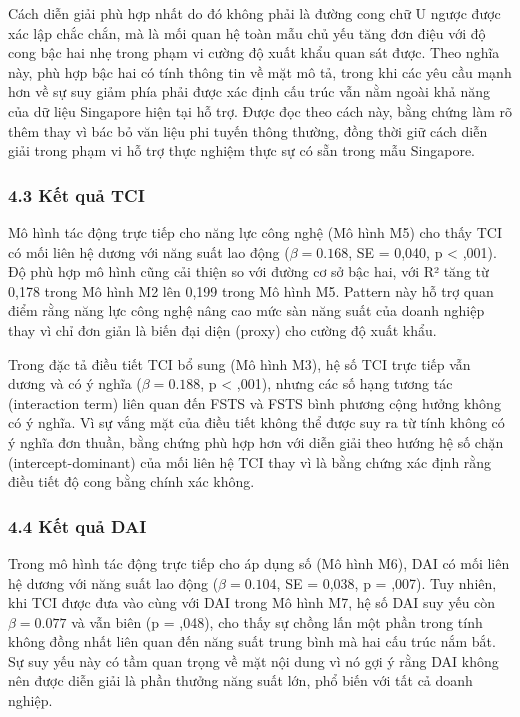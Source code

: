 \documentclass[12pt,a4paper]{article}
\begin{document}
Cách diễn giải phù hợp nhất do đó không phải là đường cong chữ U ngược
được xác lập chắc chắn, mà là mối quan hệ toàn mẫu chủ yếu tăng đơn điệu
với độ cong bậc hai nhẹ trong phạm vi cường độ xuất khẩu quan sát được.
Theo nghĩa này, phù hợp bậc hai có tính thông tin về mặt mô tả, trong
khi các yêu cầu mạnh hơn về sự suy giảm phía phải được xác định cấu trúc
vẫn nằm ngoài khả năng của dữ liệu Singapore hiện tại hỗ trợ. Được đọc
theo cách này, bằng chứng làm rõ thêm thay vì bác bỏ văn liệu phi tuyến
thông thường, đồng thời giữ cách diễn giải trong phạm vi hỗ trợ thực
nghiệm thực sự có sẵn trong mẫu Singapore.

\hypertarget{43-kux1ebft-quux1ea3-tci}{%
\subsubsection{4.3 Kết quả TCI}\label{43-kux1ebft-quux1ea3-tci}}

Mô hình tác động trực tiếp cho năng lực công nghệ (Mô hình M5) cho thấy
TCI có mối liên hệ dương với năng suất lao động (\(\beta = 0.168\), SE =
0,040, p \textless{} ,001). Độ phù hợp mô hình cũng cải thiện so với
đường cơ sở bậc hai, với R² tăng từ 0,178 trong Mô hình M2 lên 0,199
trong Mô hình M5. Pattern này hỗ trợ quan điểm rằng năng lực công nghệ
nâng cao mức sàn năng suất của doanh nghiệp thay vì chỉ đơn giản là biến
đại diện (proxy) cho cường độ xuất khẩu.

Trong đặc tả điều tiết TCI bổ sung (Mô hình M3), hệ số TCI trực tiếp vẫn
dương và có ý nghĩa (\(\beta = 0.188\), p \textless{} ,001), nhưng các
số hạng tương tác (interaction term) liên quan đến FSTS và FSTS bình
phương cộng hưởng không có ý nghĩa. Vì sự vắng mặt của điều tiết không
thể được suy ra từ tính không có ý nghĩa đơn thuần, bằng chứng phù hợp
hơn với diễn giải theo hướng hệ số chặn (intercept-dominant) của mối
liên hệ TCI thay vì là bằng chứng xác định rằng điều tiết độ cong bằng
chính xác không.

\hypertarget{44-kux1ebft-quux1ea3-dai}{%
\subsubsection{4.4 Kết quả DAI}\label{44-kux1ebft-quux1ea3-dai}}

Trong mô hình tác động trực tiếp cho áp dụng số (Mô hình M6), DAI có mối
liên hệ dương với năng suất lao động (\(\beta = 0.104\), SE = 0,038, p =
,007). Tuy nhiên, khi TCI được đưa vào cùng với DAI trong Mô hình M7, hệ
số DAI suy yếu còn \(\beta = 0.077\) và vẫn biên (p = ,048), cho thấy sự
chồng lấn một phần trong tính không đồng nhất liên quan đến năng suất
trung bình mà hai cấu trúc nắm bắt. Sự suy yếu này có tầm quan trọng về
mặt nội dung vì nó gợi ý rằng DAI không nên được diễn giải là phần
thưởng năng suất lớn, phổ biến với tất cả doanh nghiệp.
\end{document}
